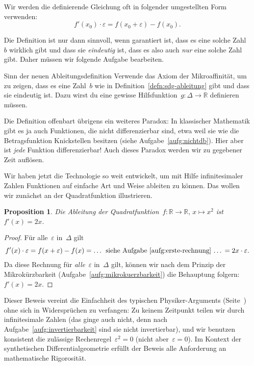 \documentclass[twoside]{../zirkelblatt}
\newcommand{\RR}{\mathbb{R}}
\theoremstyle{definition}
\theoremstyle{plain}
\newtheorem{prop}[defn]{Proposition}
\theoremstyle{remark}
\begin{document}
Wir werden die definierende Gleichung oft in folgender umgestellten Form
verwenden:
\[ f'(x_0) \cdot \varepsilon = f(x_0 + \varepsilon) - f(x_0). \]

Die Definition ist nur dann sinnvoll, wenn garantiert ist, dass es eine
solche Zahl~$b$ wirklich gibt und dass sie \emph{eindeutig} ist, dass es also
auch \emph{nur} eine solche Zahl gibt. Daher müssen wir folgende Aufgabe
bearbeiten.

\begin{aufgabeShaded}{Sinn der neuen Ableitungsdefinition}
Verwende das Axiom der Mikroaffinität, um zu zeigen, dass es eine Zahl~$b$ wie in
Definition~\ref{defn:sdg-ableitung} gibt und dass sie eindeutig ist. Dazu wirst
du eine gewisse Hilfsfunktion~$g : \Delta \to \RR$ definieren müssen.
\end{aufgabeShaded}

Die\marginpar[\hfill\dbend]{\dbend} Definition offenbart übrigens ein weiteres Paradox: In klassischer
Mathematik gibt es ja auch Funktionen, die nicht differenzierbar sind, etwa
weil sie wie die Betragsfunktion Knickstellen besitzen (siehe
Aufgabe~\ref{aufg:nichtdb}). Hier aber ist \emph{jede}
Funktion differenzierbar! Auch dieses Paradox werden wir zu gegebener Zeit
auflösen.

Wir haben jetzt die Technologie so weit entwickelt, um mit Hilfe
infinitesimaler Zahlen Funktionen auf einfache Art und Weise ableiten zu
können. Das wollen wir zunächst an der Quadratfunktion illustrieren.

\begin{prop}\label{prop:ableitung-quadratfunktion-sdg}
Die Ableitung der Quadratfunktion~$f : \RR \to \RR,\,x \mapsto x^2$
ist~$f'(x) = 2x$.\end{prop}
\begin{proof}Für alle~$\varepsilon$ in~$\Delta$ gilt
\[ f'(x) \cdot \varepsilon =
  f(x + \varepsilon) - f(x) =
  \text{\ldots{} siehe Aufgabe~\ref{aufg:erste-rechnung} \ldots} =
  2x \cdot \varepsilon. \]
Da diese Rechnung für \emph{alle}~$\varepsilon$ in~$\Delta$ gilt, können wir nach dem
Prinzip der Mikrokürzbarkeit (Aufgabe~\ref{aufg:mikrokuerzbarkeit}) die
Behauptung folgern: $f'(x) = 2x$.
\end{proof}

Dieser Beweis vereint die Einfachheit des typischen Physiker-Arguments
(Seite~\pageref{par:schizophren}) ohne sich in Widersprüchen zu verfangen: Zu
keinem Zeitpunkt teilen wir durch infinitesimale Zahlen (das ginge auch nicht,
denn nach Aufgabe~\ref{aufg:invertierbarkeit} sind sie nicht invertierbar), und
wir benutzen konsistent die zulässige Rechenregel~$\varepsilon^2 = 0$ (nicht
aber~$\varepsilon = 0$). Im Kontext der synthetischen Differentialgeometrie
erfüllt der Beweis alle Anforderung an mathematische Rigorosität.
\end{document}
